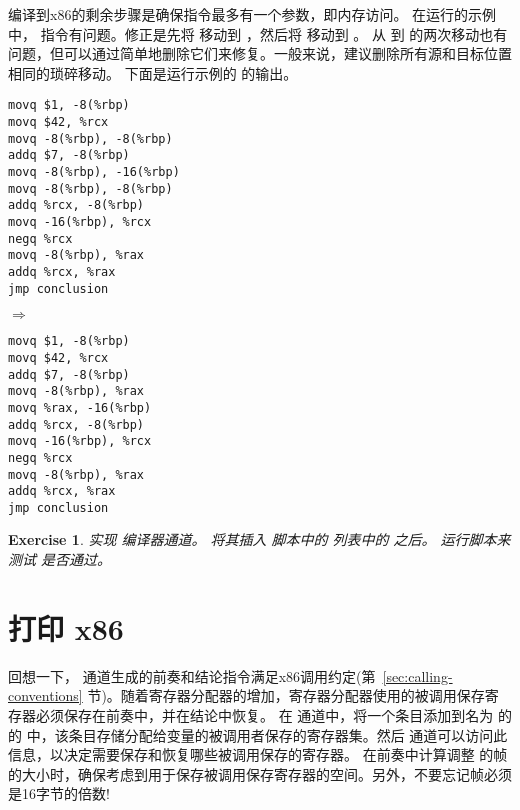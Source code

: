 \documentclass[11pt]{book}
\newtheorem{exercise}[theorem]{Exercise}
\begin{document}
编译到x86的剩余步骤是确保指令最多有一个参数，即内存访问。
在运行的示例中， 
指令有问题。修正是先将 
移动到  ，然后将  移动到  。
%
从  到  的两次移动也有问题，但可以通过简单地删除它们来修复。一般来说，建议删除所有源和目标位置相同的琐碎移动。
%
下面是运行示例的  的输出。
\begin{center}
  \begin{minipage}{0.4\textwidth}
\begin{lstlisting}
movq $1, -8(%rbp)
movq $42, %rcx
movq -8(%rbp), -8(%rbp)
addq $7, -8(%rbp)
movq -8(%rbp), -16(%rbp)
movq -8(%rbp), -8(%rbp)
addq %rcx, -8(%rbp)
movq -16(%rbp), %rcx
negq %rcx
movq -8(%rbp), %rax
addq %rcx, %rax
jmp conclusion
\end{lstlisting}
\end{minipage}
$\Rightarrow\qquad$
\begin{minipage}{0.45\textwidth}
\begin{lstlisting}
movq $1, -8(%rbp)
movq $42, %rcx
addq $7, -8(%rbp)
movq -8(%rbp), %rax
movq %rax, -16(%rbp)
addq %rcx, -8(%rbp)
movq -16(%rbp), %rcx
negq %rcx
movq -8(%rbp), %rax
addq %rcx, %rax
jmp conclusion
\end{lstlisting}
\end{minipage}
\end{center}
  
\begin{exercise}\normalfont
%
实现  编译器通道。
%
将其插入  脚本中的  列表中的  之后。
%
运行脚本来测试  是否通过。
\end{exercise}


\section{打印 x86}
\label{sec:print-x86-reg-alloc}

回想一下，  通道生成的前奏和结论指令满足x86调用约定(第~\ref{sec:calling-conventions} 节)。随着寄存器分配器的增加，寄存器分配器使用的被调用保存寄存器必须保存在前奏中，并在结论中恢复。
在  通道中，将一个条目添加到名为  的
  的  中，该条目存储分配给变量的被调用者保存的寄存器集。然后
 通道可以访问此信息，以决定需要保存和恢复哪些被调用保存的寄存器。
%
在前奏中计算调整  的帧的大小时，确保考虑到用于保存被调用保存寄存器的空间。另外，不要忘记帧必须是16字节的倍数!
\end{document}
